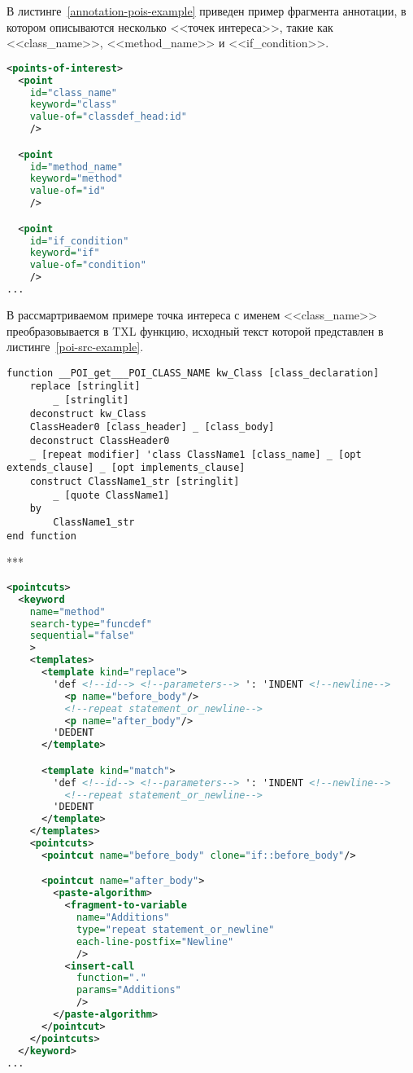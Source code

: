 В листинге~\ref{annotation-pois-example} приведен пример фрагмента аннотации, в котором описываются несколько <<точек интереса>>, такие как <<class\_name>>, <<method\_name>> и <<if\_condition>>.

\begin{lstlisting}[frame=single, language=XML, label={annotation-pois-example}, caption={Пример}]
<points-of-interest>
  <point
    id="class_name"
    keyword="class"
    value-of="classdef_head:id"
    />

  <point
    id="method_name"
    keyword="method"
    value-of="id"
    />

  <point
    id="if_condition"
    keyword="if"
    value-of="condition"
    />
...
\end{lstlisting}

В рассмартриваемом примере точка интереса с именем <<class\_name>> преобразовывается в TXL функцию, исходный текст которой представлен в листинге~\ref{poi-src-example}.

\begin{lstlisting}[frame=single, language=TXL, label={poi-src-example}, caption={Пример синтезированной функции для точки интереса \textit{class\_name}}]
function __POI_get___POI_CLASS_NAME kw_Class [class_declaration]
	replace [stringlit]
		_ [stringlit]
	deconstruct kw_Class
    ClassHeader0 [class_header] _ [class_body]
	deconstruct ClassHeader0
    _ [repeat modifier] 'class ClassName1 [class_name] _ [opt extends_clause] _ [opt implements_clause]
	construct ClassName1_str [stringlit]
		_ [quote ClassName1]
	by
		ClassName1_str
end function
\end{lstlisting}

***

\begin{lstlisting}[frame=single, language=XML, label={annotation-pointcuts-example}, caption={Пример}]
<pointcuts>
  <keyword
    name="method"
    search-type="funcdef"
    sequential="false"
    >
    <templates>
      <template kind="replace">
        'def <!--id--> <!--parameters--> ': 'INDENT <!--newline-->
          <p name="before_body"/>
          <!--repeat statement_or_newline-->
          <p name="after_body"/>
        'DEDENT
      </template>

      <template kind="match">
        'def <!--id--> <!--parameters--> ': 'INDENT <!--newline-->
          <!--repeat statement_or_newline-->
        'DEDENT
      </template>
    </templates>
    <pointcuts>
      <pointcut name="before_body" clone="if::before_body"/>

      <pointcut name="after_body">
        <paste-algorithm>
          <fragment-to-variable
            name="Additions"
            type="repeat statement_or_newline"
            each-line-postfix="Newline"
            />
          <insert-call
            function="."
            params="Additions"
            />
        </paste-algorithm>
      </pointcut>
    </pointcuts>
  </keyword>
...
\end{lstlisting}

